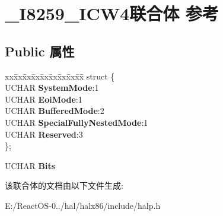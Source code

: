 \hypertarget{union___i8259___i_c_w4}{}\section{\+\_\+\+I8259\+\_\+\+I\+C\+W4联合体 参考}
\label{union___i8259___i_c_w4}
\subsection*{Public 属性}
\begin{DoxyCompactItemize}
\item 
\mbox{\label{union___i8259___i_c_w4_a2a65cfba596defb09d8309214d26f5d7}} 
\begin{tabbing}
xx\=xx\=xx\=xx\=xx\=xx\=xx\=xx\=xx\=\kill
struct \{\\
\>UCHAR {\bfseries SystemMode}:1\\
\>UCHAR {\bfseries EoiMode}:1\\
\>UCHAR {\bfseries BufferedMode}:2\\
\>UCHAR {\bfseries SpecialFullyNestedMode}:1\\
\>UCHAR {\bfseries Reserved}:3\\
\}; \\

\end{tabbing}\item 
\mbox{\label{union___i8259___i_c_w4_a9806223c84769a9ae728ce989e867776}} 
U\+C\+H\+AR {\bfseries Bits}
\end{DoxyCompactItemize}


该联合体的文档由以下文件生成\+:\begin{DoxyCompactItemize}
\item 
E\+:/\+React\+O\+S-\/0../hal/halx86/include/halp.\+h\end{DoxyCompactItemize}
